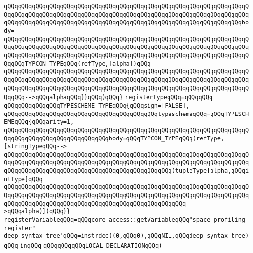 \verb|qQQqqQQqqQQqqQQqqQQqqQQqqQQqqQQqqQQqqQQqqQQqqQQqqQQqqQQqqQQqqQQqqQQqqQQqqQQqqQQqqQQqqQQqqQQqqQQqqQQqqQQqqQQqqQQqqQQqqQQqqQQqqQQqqQQqqQQqqQQqqQQqqQQqqQQqqQQqqQQqqQQqqQQqqQQqqQQqqQQqqQQqqQQqqQQqqQQqqQQqqQQqqQQqbody=|\newline
\verb|qQQqqQQqqQQqqQQqqQQqqQQqqQQqqQQqqQQqqQQqqQQqqQQqqQQqqQQqqQQqqQQqqQQqqQQqqQQqqQQqqQQqqQQqqQQqqQQqqQQqqQQqqQQqqQQqqQQqqQQqqQQqqQQqqQQqqQQqqQQqqQQqqQQqqQQqqQQqqQQqqQQqqQQqqQQqqQQqqQQqqQQqqQQqqQQqqQQqqQQqqQQqqQQqqQQqqQQqTYPCON_TYPEqQQq(refType,[alpha])qQQq|\newline
\verb|qQQqqQQqqQQqqQQqqQQqqQQqqQQqqQQqqQQqqQQqqQQqqQQqqQQqqQQqqQQqqQQqqQQqqQQqqQQqqQQqqQQqqQQqqQQqqQQqqQQqqQQqqQQqqQQqqQQqqQQqqQQqqQQqqQQqqQQqqQQqqQQqqQQqqQQqqQQqqQQqqQQqqQQqqQQqqQQqqQQqqQQqqQQqqQQqqQQqqQQqqQQqqQQqqQQqqQQq-->qQQqalphaqQQq}}qQQq)qQQq}|\newline
\newline
\verb|registerTypeqQQq=qQQqqQQq|\newline
\verb|qQQqqQQqqQQqqQQqTYPESCHEME_TYPEqQQq{qQQqsign=[FALSE],|\newline
\verb|qQQqqQQqqQQqqQQqqQQqqQQqqQQqqQQqqQQqqQQqqQQqtypeschemeqQQq=qQQqTYPESCHEMEqQQq{qQQqarity=1,|\newline
\verb|qQQqqQQqqQQqqQQqqQQqqQQqqQQqqQQqqQQqqQQqqQQqqQQqqQQqqQQqqQQqqQQqqQQqqQQqqQQqqQQqqQQqqQQqqQQqqQQqqQQqbody=qQQqTYPCON_TYPEqQQq(refType,[stringTypeqQQq-->|\newline
\verb|qQQqqQQqqQQqqQQqqQQqqQQqqQQqqQQqqQQqqQQqqQQqqQQqqQQqqQQqqQQqqQQqqQQqqQQqqQQqqQQqqQQqqQQqqQQqqQQqqQQqqQQqqQQqqQQqqQQqqQQqqQQqqQQqqQQqqQQqqQQqqQQqqQQqqQQqqQQqqQQqqQQqqQQqqQQqqQQqqQQqqQQqqQQq(tupleType[alpha,qQQqintType]qQQq|\newline
\verb|qQQqqQQqqQQqqQQqqQQqqQQqqQQqqQQqqQQqqQQqqQQqqQQqqQQqqQQqqQQqqQQqqQQqqQQqqQQqqQQqqQQqqQQqqQQqqQQqqQQqqQQqqQQqqQQqqQQqqQQqqQQqqQQqqQQqqQQqqQQqqQQqqQQqqQQqqQQqqQQqqQQqqQQqqQQqqQQqqQQqqQQqqQQqqQQq-->qQQqalpha)])qQQq}}|\newline
\newline
\verb|registerVariableqQQq=qQQqcore_access::getVariableqQQq"space_profiling_register"|\newline
\newline
\verb|deep_syntax_tree'qQQq=instrdec((0,qQQq0),qQQqNIL,qQQqdeep_syntax_tree)qQQq|\newline
\newline
\verb|inqQQq|\newline
\verb|qQQqqQQqqQQqLOCAL_DECLARATIONqQQq(|\newline
\newline
